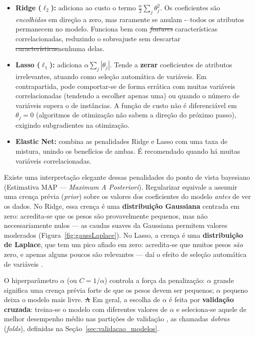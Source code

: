 \documentclass[msc]{on} %
\makeatletter
\providecommand{\DIFaddtex}[1]{{\protect\color{red}#1}} %
\providecommand{\DIFdeltex}[1]{{\protect\color{red}\sout{#1}}} %
\providecommand{\DIFaddbegin}{} %
\providecommand{\DIFaddend}{} %
\providecommand{\DIFdelbegin}{} %
\providecommand{\DIFdelend}{} %
\providecommand{\DIFadd}[1]{\texorpdfstring{\DIFaddtex{#1}}{#1}} %
\providecommand{\DIFdel}[1]{\texorpdfstring{\DIFdeltex{#1}}{}} %
\let\sout@orig\sout %
\renewcommand{\sout}[1]{\ifmmode\text{\sout@orig{\ensuremath{#1}}}\else\sout@orig{#1}\fi} %
\makeatother
\begin{document}
\begin{itemize}
	\item \textbf{Ridge (\(\ell_2\)):} adiciona ao custo o termo \(\frac{\alpha}{2} \sum_j \theta_j^2\). Os coeficientes são \textit{encolhidos} em direção a zero, mas raramente se anulam -\DIFaddbegin \DIFadd{--}\DIFaddend  todos os atributos permanecem no modelo. Funciona bem com \DIFdelbegin \textit{\DIFdel{features}} %
\DIFdelend\ifhmode\hskip0pt\fi \DIFaddbegin \DIFadd{características }\DIFaddend correlacionadas, reduzindo o sobreajuste sem descartar \DIFdelbegin \DIFdel{características}\DIFdelend\ifhmode\hskip0pt\fi \DIFaddbegin \DIFadd{nenhuma delas}\DIFaddend .

	\item \textbf{Lasso (\(\ell_1\)):} adiciona \(\alpha \sum_j |\theta_j|\). Tende a \textbf{zerar} coeficientes de atributos irrelevantes, atuando como seleção automática de variáveis. Em contrapartida, pode comportar-se de forma errática com muitas variáveis correlacionadas (tendendo a escolher apenas uma) ou quando o número de variáveis supera o de instâncias. A função de custo não é diferenciável em \(\theta_j = 0\) (algoritmos de otimização não sabem a direção do próximo passo), exigindo subgradientes na otimização.

	\item \textbf{Elastic Net:} combina as penalidades Ridge e Lasso com uma taxa de mistura, unindo os benefícios de ambas. É recomendado quando há muitas variáveis correlacionadas.
\end{itemize}

Existe uma interpretação elegante dessas penalidades do ponto de vista bayesiano (Estimativa MAP --- \textit{Maximum A Posteriori}). Regularizar equivale a assumir uma crença prévia (\textit{prior}) sobre os valores dos coeficientes do modelo \emph{antes} de ver os dados. No Ridge, essa crença é uma \textbf{distribuição Gaussiana} centrada em zero: acredita-se que os pesos são provavelmente pequenos, mas não necessariamente nulos --- as caudas suaves da Gaussiana permitem valores moderados (Figura~\ref{fig:gaussLaplace}). No Lasso, a crença é uma \textbf{distribuição de Laplace}, que tem um pico afiado em zero: acredita-se que muitos pesos \emph{são} zero, e apenas alguns poucos são relevantes --- daí o efeito de seleção automática de variáveis \citep{geron2019maos, Levada2026}.

O hiperparâmetro \(\alpha\) (ou \(C = 1/\alpha\)) controla a força da penalização: \(\alpha\) grande significa uma crença prévia forte de que os pesos devem ser pequenos; \(\alpha\) pequeno deixa o modelo mais livre. \DIFdelbegin \DIFdel{A }\DIFdelend\ifhmode\hskip0pt\fi \DIFaddbegin \DIFadd{Em geral, a }\DIFaddend escolha de \(\alpha\) é feita por \textbf{validação cruzada}: treina-se o modelo com diferentes valores de \(\alpha\) e seleciona-se aquele de melhor desempenho médio nas partições de validação \citep{geron2019maos}, as chamadas \emph{dobras} (\textit{folds}), definidas na Seção~\ref{sec:validacao_modelos}.
\end{document}
